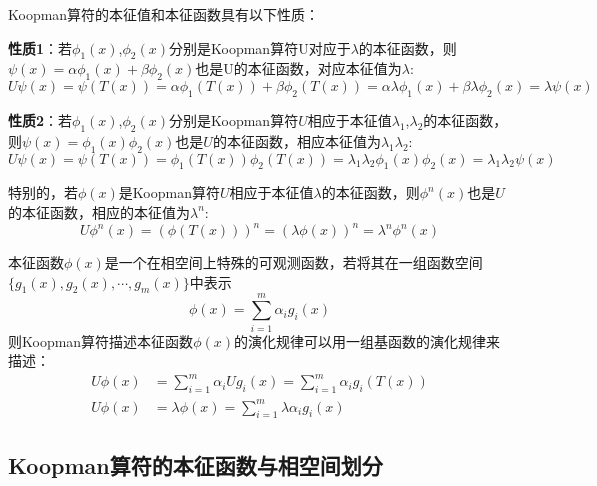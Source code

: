Koopman算符的本征值和本征函数具有以下性质：

\textbf{性质1}：若$\phi_1(x)$,$\phi_2(x)$分别是Koopman算符U对应于$\lambda$的本征函数，则$\psi(x)=\alpha\phi_1(x)+\beta\phi_2(x)$也是U的本征函数，对应本征值为$\lambda$:
\begin{equation}
    U\psi(x)=\psi(T(x))=\alpha\phi_1(T(x))+\beta\phi_2(T(x))=\alpha\lambda\phi_1(x)+\beta
    \lambda\phi_2(x)=\lambda\psi(x)
\end{equation}

\textbf{性质2}：若$\phi_1(x)$,$\phi_2(x)$分别是Koopman算符$U$相应于本征值$\lambda_1$,$\lambda_2$的本征函数，则$\psi(x)=\phi_1(x)\phi_2(x)$也是$U$的本征函数，相应本征值为$λ_1λ_2$: 
\begin{equation}
U\psi(x)=\psi(T(x))=\phi_1(T(x))\phi_2(T(x))=\lambda_1\lambda_2\phi_1(x)\phi_2(x)=\lambda_1\lambda_2\psi(x)
\end{equation}

特别的，若$\phi(x)$是Koopman算符$U$相应于本征值$\lambda$的本征函数，则$\phi^n(x)$也是$U$的本征函数，相应的本征值为$\lambda^n$:
\begin{equation}
    U\phi^n(x)=(\phi(T(x)))^n=(\lambda\phi(x))^n=λ^n\phi^n(x)
\end{equation}

本征函数$\phi(x)$是一个在相空间上特殊的可观测函数，若将其在一组函数空间$\{g_1(x),g_2(x),\cdots,g_m(x)\}$中表示
\begin{equation}
    \phi(x)=\sum_{i=1}^m\alpha_ig_i(x)
\end{equation}
则Koopman算符描述本征函数$\phi(x)$的演化规律可以用一组基函数的演化规律来描述：
\begin{equation}
    \begin{aligned}
        U\phi(x)&=\sum_{i=1}^m\alpha_iUg_i(x)=\sum_{i=1}^m\alpha_ig_i(T(x))\\
        U\phi(x)&=\lambda\phi(x)=\sum_{i=1}^m\lambda\alpha_ig_i(x)
    \end{aligned}
\end{equation}

\subsection{Koopman算符的本征函数与相空间划分}

